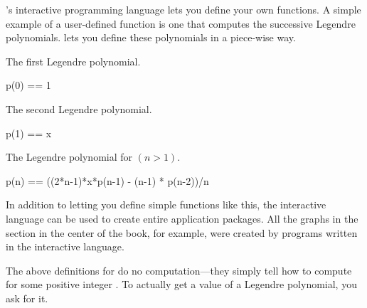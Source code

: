 
\Language{}'s interactive programming language lets you
define your own functions.
A simple example of a user-defined function is one
that computes the successive Legendre polynomials.
\Language{} lets you define these polynomials in a piece-wise way.

%
\begin{xtc}
\begin{xtccomment}
The first Legendre polynomial.
\end{xtccomment}
\begin{spadsrc}
p(0) == 1
\end{spadsrc}
\end{xtc}
%
\begin{xtc}
\begin{xtccomment}
The second Legendre polynomial.
\end{xtccomment}
\begin{spadsrc}
p(1) == x
\end{spadsrc}
\end{xtc}
%
\begin{xtc}
\begin{xtccomment}
The  Legendre polynomial for $(n > 1)$.
\end{xtccomment}
\begin{spadsrc}
p(n) == ((2*n-1)*x*p(n-1) - (n-1) * p(n-2))/n
\end{spadsrc}
\end{xtc}

In addition to letting you define simple functions like this,
the interactive language can be used
to create entire application packages.
All the graphs in the \Gallery{} section
in the center of the book, for example,
were created by programs written in the interactive language.

The above definitions for  do no computation---they simply
tell \Language{} how to compute  for some positive
integer .
To actually get a value of a Legendre polynomial, you ask for it.

